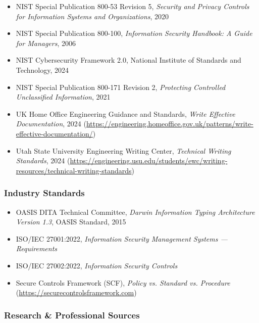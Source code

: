 \documentclass[11pt,letterpaper]{article}
\begin{document}
\begin{itemize}[leftmargin=*]
  \item NIST Special Publication 800-53 Revision 5, \textit{Security and Privacy Controls for Information Systems and Organizations}, 2020
  \item NIST Special Publication 800-100, \textit{Information Security Handbook: A Guide for Managers}, 2006
  \item NIST Cybersecurity Framework 2.0, National Institute of Standards and Technology, 2024
  \item NIST Special Publication 800-171 Revision 2, \textit{Protecting Controlled Unclassified Information}, 2021
  \item UK Home Office Engineering Guidance and Standards, \textit{Write Effective Documentation}, 2024 (\url{https://engineering.homeoffice.gov.uk/patterns/write-effective-documentation/})
  \item Utah State University Engineering Writing Center, \textit{Technical Writing Standards}, 2024 (\url{https://engineering.usu.edu/students/ewc/writing-resources/technical-writing-standards})
\end{itemize}

\subsubsection{Industry Standards}

\begin{itemize}[leftmargin=*]
  \item OASIS DITA Technical Committee, \textit{Darwin Information Typing Architecture Version 1.3}, OASIS Standard, 2015
  \item ISO/IEC 27001:2022, \textit{Information Security Management Systems --- Requirements}
  \item ISO/IEC 27002:2022, \textit{Information Security Controls}
  \item Secure Controls Framework (SCF), \textit{Policy vs. Standard vs. Procedure} (\url{https://securecontrolsframework.com})
\end{itemize}

\subsubsection{Research \& Professional Sources}
\end{document}
